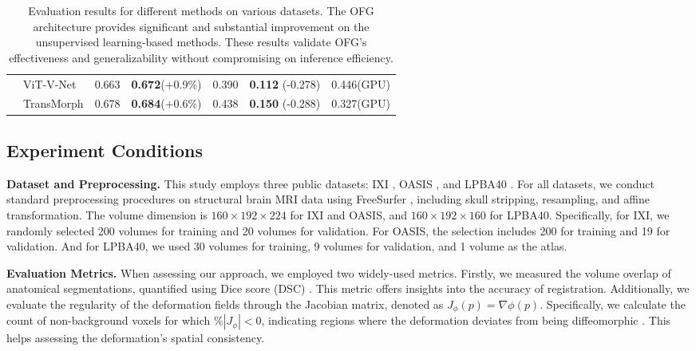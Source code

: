 \documentclass[10pt,twocolumn,letterpaper]{article}
\begin{document}
\begin{table*}[t]
\begin{center}
{{\begin{tabular}{llccccc}
    & ViT-V-Net \cite{chen2021vitvnet} & 0.663 & \textbf{0.672}(+0.9\%) & 0.390 & \textbf{0.112} (-0.278) & 0.446(GPU) \\
    & TransMorph \cite{Chen_2022} & 0.678 & \textbf{0.684}(+0.6\%) & 0.438 & \textbf{0.150} (-0.288) & 0.327(GPU) \\
    \bottomrule
    \end{tabular}
    }}
    \end{center}
\caption{Evaluation results for different methods on various datasets. The OFG architecture provides significant and substantial improvement on the unsupervised learning-based methods. These results validate OFG's effectiveness and generalizability without compromising on inference efficiency.} \label{tab:results}
\end{table*}


\subsection{Experiment Conditions}


\textbf{Dataset and Preprocessing.} This study employs three public datasets: IXI \cite{ixi}, OASIS \cite{10.1162/jocn.2007.19.9.1498}, and LPBA40 \cite{lpba}. For all datasets, we conduct standard preprocessing procedures on structural brain MRI data using FreeSurfer \cite{freesurfer}, including skull stripping, resampling, and affine transformation. The volume dimension is $160 \times 192 \times 224$ for IXI and OASIS, and $160 \times 192 \times 160$ for LPBA40. Specifically, for IXI, we randomly selected 200 volumes for training and 20 volumes for validation. For OASIS, the selection includes 200 for training and 19 for validation. And for LPBA40, we used 30 volumes for training, 9 volumes for validation, and 1 volume as the atlas.

\textbf{Evaluation Metrics.} When assessing our approach, we employed two widely-used metrics. Firstly, we measured the volume overlap of anatomical segmentations, quantified using Dice score (DSC) \cite{Balakrishnan_2019, mul1989com}. This metric offers insights into the accuracy of registration. Additionally, we evaluate the regularity of the deformation fields through the Jacobian matrix, denoted as $J_{\phi}(p) = \nabla\phi(p)$. Specifically, we calculate the count of non-background voxels for which $\% |J_{\phi}| < 0$, indicating regions where the deformation deviates from being diffeomorphic \cite{afas2007neu}. This helps assessing the deformation's spatial consistency.
\end{document}
